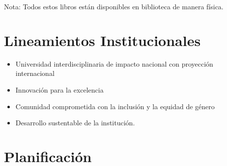 \documentclass[11pt]{article}
\begin{document}
Nota: Todos estos libros están disponibles en biblioteca de manera física.

\section{Lineamientos Institucionales}
\label{sec:orgbc03701}

\begin{itemize}
\item Universidad interdisciplinaria de impacto nacional con proyección internacional
\item Innovación para la excelencia
\item Comunidad comprometida con la inclusión y la equidad de género
\item Desarrollo sustentable de la institución.
\end{itemize}

\section{Planificación}
\label{sec:orgff9c800}
\end{document}
